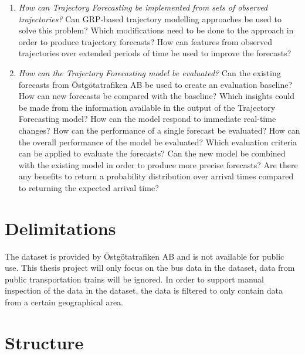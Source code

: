\begin{description}
\begin{enumerate}
    \item \textit{How can Trajectory Forecasting be implemented from sets of observed trajectories?} \newline
    Can GRP-based trajectory modelling approaches be used to solve this problem?
    Which modifications need to be done to the approach in order to produce trajectory forecasts?
    How can features from observed trajectories over extended periods of time be used to improve the forecasts?

    \item \textit{How can the Trajectory Forecasting model be evaluated?} \newline
    Can the existing forecasts from Östgötatrafiken AB be used to create an evaluation baseline?
    How can new forecasts be compared with the baseline?
    Which insights could be made from the information available in the output of the Trajectory Forecasting model?
    How can the model respond to immediate real-time changes?
    How can the performance of a single forecast be evaluated?
    How can the overall performance of the model be evaluated?
    Which evaluation criteria can be applied to evaluate the forecasts?
    Can the new model be combined with the existing model in order to produce more precise forecasts?
    Are there any benefits to return a probability distribution over arrival times compared to returning the expected arrival time?
  \end{enumerate}
\end{description}

\section{Delimitations}
\label{sec:delimitations}
The dataset is provided by Östgötatrafiken AB and is not available for public use.
This thesis project will only focus on the bus data in the dataset, data from public transportation trains will be ignored.
In order to support manual inspection of the data in the dataset, the data is filtered to only contain data from a certain geographical area.

\section{Structure}
